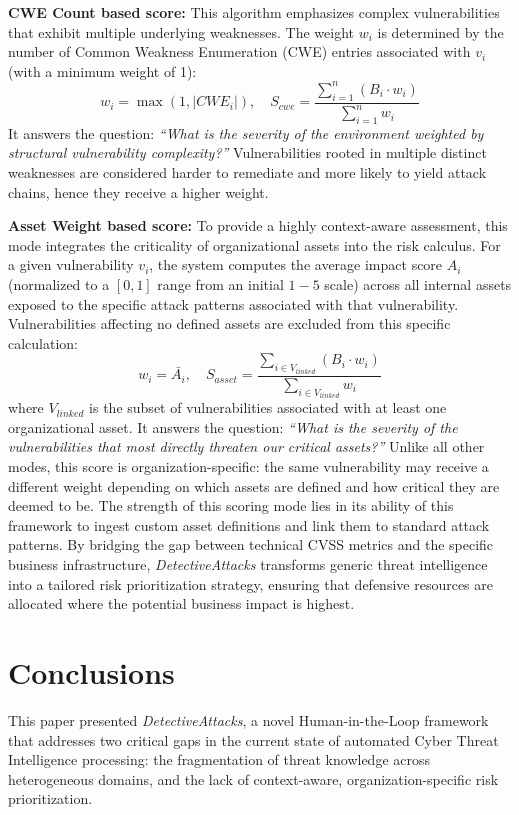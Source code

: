 \documentclass[conference]{IEEEtran}
\begin{document}
\textbf{CWE Count based score:}
This algorithm emphasizes complex vulnerabilities that exhibit multiple underlying weaknesses. The weight $w_i$ is determined by the number of Common Weakness Enumeration (CWE) entries associated with $v_i$ (with a minimum weight of 1):
\begin{equation}
w_i = \max(1, |CWE_i|), \quad S_{cwe} = \frac{\sum_{i=1}^{n} (B_i \cdot w_i)}{\sum_{i=1}^{n} w_i}
\end{equation}
It answers the question: \textit{``What is the severity of the environment weighted by structural vulnerability complexity?''} Vulnerabilities rooted in multiple distinct weaknesses are considered harder to remediate and more likely to yield attack chains, hence they receive a higher weight.

\textbf{Asset Weight based score:}
To provide a highly context-aware assessment, this mode integrates the criticality of organizational assets into the risk calculus. For a given vulnerability $v_i$, the system computes the average impact score $A_i$ (normalized to a $[0, 1]$ range from an initial $1-5$ scale) across all internal assets exposed to the specific attack patterns associated with that vulnerability. Vulnerabilities affecting no defined assets are excluded from this specific calculation:
\begin{equation}
w_i = \bar{A_i}, \quad S_{asset} = \frac{\sum_{i \in V_{linked}} (B_i \cdot w_i)}{\sum_{i \in V_{linked}} w_i}
\end{equation}
where $V_{linked}$ is the subset of vulnerabilities associated with at least one organizational asset. It answers the question: \textit{``What is the severity of the vulnerabilities that most directly threaten our critical assets?''} Unlike all other modes, this score is organization-specific: the same vulnerability may receive a different weight depending on which assets are defined and how critical they are deemed to be.
The strength of this scoring mode lies in its ability of this framework to ingest custom asset definitions and link them to standard attack patterns. By bridging the gap between technical CVSS metrics and the specific business infrastructure, \textit{DetectiveAttacks} transforms generic threat intelligence into a tailored risk prioritization strategy, ensuring that defensive resources are allocated where the potential business impact is highest.

\section{Conclusions}
\label{conclusion}
This paper presented \textit{DetectiveAttacks}, a novel Human-in-the-Loop framework that addresses two critical gaps in the current state of automated Cyber Threat Intelligence processing: the fragmentation of threat knowledge across heterogeneous domains, and the lack of context-aware, organization-specific risk prioritization.
\end{document}
